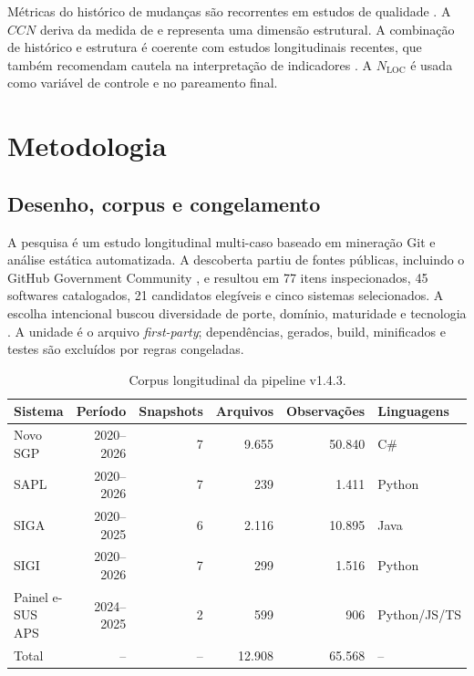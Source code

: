 \documentclass[12pt]{article}
\newcommand{\NLOC}{\ensuremath{N_{\mathrm{LOC}}}}
\newcommand{\CCN}{\ensuremath{CCN}}
\begin{document}
Métricas do histórico de mudanças são recorrentes em estudos de qualidade \cite{graves2000changehistory,moser2008changemetrics}. A \CCN{} deriva da medida de \cite{mccabe1976complexity} e representa uma dimensão estrutural. A combinação de histórico e estrutura é coerente com estudos longitudinais recentes, que também recomendam cautela na interpretação de indicadores \cite{sutoyo2025tracing}. A \NLOC{} é usada como variável de controle e no pareamento final.

\section{Metodologia}

\subsection{Desenho, corpus e congelamento}

A pesquisa é um estudo longitudinal multi-caso baseado em mineração Git e análise estática automatizada. A descoberta partiu de fontes públicas, incluindo o GitHub Government Community \cite{githubgovernment}, e resultou em 77 itens inspecionados, 45 softwares catalogados, 21 candidatos elegíveis e cinco sistemas selecionados. A escolha intencional buscou diversidade de porte, domínio, maturidade e tecnologia \cite{runeson2009casestudy,baltes2022sampling}. A unidade é o arquivo \emph{first-party}; dependências, gerados, build, minificados e testes são excluídos por regras congeladas.

\begin{table}[H]
\centering\small
\caption{Corpus longitudinal da pipeline v1.4.3.}\label{tab:corpus}
\begin{tabular}{lrrrrl}
\toprule
\textbf{Sistema} & \textbf{Período} & \textbf{Snapshots} & \textbf{Arquivos} & \textbf{Observações} & \textbf{Linguagens} \\
\midrule
Novo SGP & 2020--2026 & 7 & 9.655 & 50.840 & C\# \\
SAPL & 2020--2026 & 7 & 239 & 1.411 & Python \\
SIGA & 2020--2025 & 6 & 2.116 & 10.895 & Java \\
SIGI & 2020--2026 & 7 & 299 & 1.516 & Python \\
Painel e-SUS APS & 2024--2025 & 2 & 599 & 906 & Python/JS/TS \\
\midrule
Total & -- & -- & 12.908 & 65.568 & -- \\
\bottomrule
\end{tabular}
\end{table}
\end{document}
